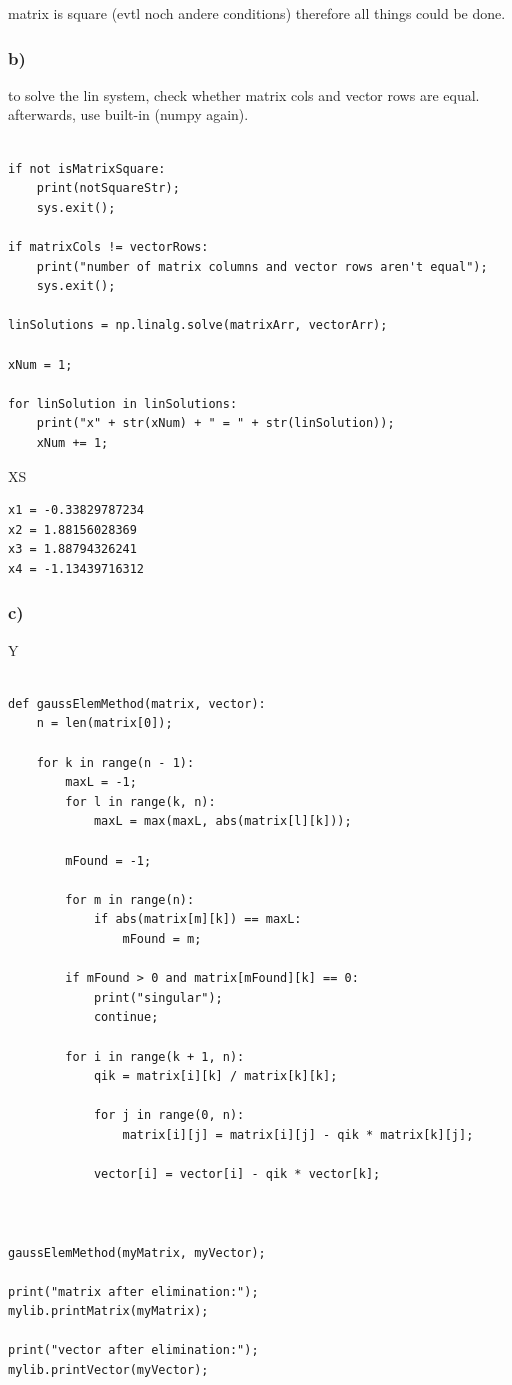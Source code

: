 matrix is square (evtl noch andere conditions) therefore all things could be done.


\subsubsection{b)}

to solve the lin system, check whether matrix cols and vector rows are equal. afterwards, use built-in (numpy again).

\begin{lstlisting}[caption=todo]

if not isMatrixSquare:
	print(notSquareStr);
	sys.exit();

if matrixCols != vectorRows:
	print("number of matrix columns and vector rows aren't equal");
	sys.exit();

linSolutions = np.linalg.solve(matrixArr, vectorArr);

xNum = 1;

for linSolution in linSolutions:
	print("x" + str(xNum) + " = " + str(linSolution));
	xNum += 1;

\end{lstlisting}

XS


\begin{lstlisting}[caption=Result of 1.1 b), keywordstyle=\color{black}]
x1 = -0.33829787234
x2 = 1.88156028369
x3 = 1.88794326241
x4 = -1.13439716312
\end{lstlisting}


\subsubsection{c)}



Y

\begin{lstlisting}[caption=todo]

def gaussElemMethod(matrix, vector):
	n = len(matrix[0]);
	
	for k in range(n - 1):
		maxL = -1;
		for l in range(k, n):
			maxL = max(maxL, abs(matrix[l][k]));
		
		mFound = -1;
		
		for m in range(n):
			if abs(matrix[m][k]) == maxL:
				mFound = m;
		
		if mFound > 0 and matrix[mFound][k] == 0:
			print("singular");
			continue;
		
		for i in range(k + 1, n):
			qik = matrix[i][k] / matrix[k][k];
			
			for j in range(0, n):
				matrix[i][j] = matrix[i][j] - qik * matrix[k][j];
			
			vector[i] = vector[i] - qik * vector[k];



gaussElemMethod(myMatrix, myVector);

print("matrix after elimination:");
mylib.printMatrix(myMatrix);

print("vector after elimination:");
mylib.printVector(myVector);

\end{lstlisting}

